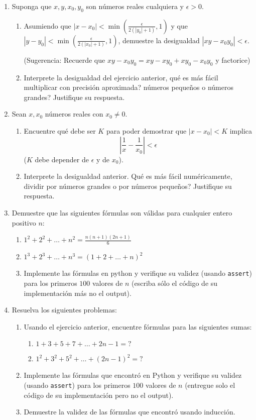 \documentclass[12pt, a4paper]{article}
\begin{document}
\begin{enumerate}
\item Suponga que $x,y,x_0,y_0$ son números reales cualquiera y $\epsilon>0$. 
\begin{enumerate}
\item Asumiendo que $|x-x_0|<\min\left(\frac{\epsilon}{2(|y_0|+1)},1\right)$ y que $|y-y_0|<\min\left(\frac{\epsilon}{2(|x_0|+1)},1\right)$, demuestre la desigualdad $|xy-x_0y_0|<\epsilon$. 

(Sugerencia: Recuerde que $xy-x_0y_0=xy-xy_0+xy_0-x_0y_0$ y factorice)

\item Interprete la desigualdad del ejercicio anterior, qué es más fácil multiplicar con precisión aproximada? números pequeños o números grandes? Justifique su respuesta.
\end{enumerate}

\item Sean $x,x_0$ números reales con $x_0\neq 0$. 
\begin{enumerate}
\item Encuentre qué debe ser $K$ para poder demostrar que  $|x-x_0|<K$ implica 
\[\left|\frac{1}{x}-\frac{1}{x_0}\right|<\epsilon\]
($K$ debe depender de $\epsilon$ y de $x_0$).

\item Interprete la desigualdad anterior. Qué es más fácil numéricamente, dividir por números grandes o por números peque\~nos? Justifique su respuesta.
\end{enumerate}

\item Demuestre que las siguientes fórmulas son válidas para cualquier entero positivo $n$:
\begin{enumerate}
\item $1^2+2^2+\dots+n^2 = \frac{n(n+1)(2n+1)}{6}$
\item $1^3+2^3+\dots+n^3 = (1+2+\dots+n)^2$
\item Implemente las fórmulas en python y verifique su validez (usando \verb!assert!) para los primeros $100$ valores de $n$ (escriba sólo el código de su implementación más no el output).
\end{enumerate} 

\item Resuelva los siguientes problemas:
\begin{enumerate}
\item
Usando el ejercicio anterior, encuentre fórmulas para las siguientes sumas: 
\begin{enumerate}
\item $1+3+5+7+\dots+ 2n-1 = ?$
\item $1^2+3^2+5^2+\dots+ (2n-1)^2 = ?$
\end{enumerate}
\item Implemente las fórmulas que encontró en Python y verifique su validez (usando \verb!assert!) para los primeros $100$ valores de $n$ (entregue solo el código de su implementación pero no el output).
\item Demuestre la validez de las fórmulas que encontró usando inducción.
\end{enumerate}


\end{enumerate}
\end{document}

